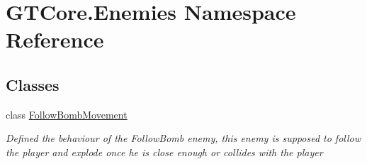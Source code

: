 \hypertarget{namespace_g_t_core_1_1_enemies}{}\section{G\+T\+Core.\+Enemies Namespace Reference}
\label{namespace_g_t_core_1_1_enemies}
\subsection*{Classes}
\begin{DoxyCompactItemize}
\item 
class \hyperlink{class_g_t_core_1_1_enemies_1_1_follow_bomb_movement}{Follow\+Bomb\+Movement}
\begin{DoxyCompactList}\small\item\em Defined the behaviour of the Follow\+Bomb enemy, this enemy is supposed to follow the player and explode once he is close enough or collides with the player \end{DoxyCompactList}\end{DoxyCompactItemize}
